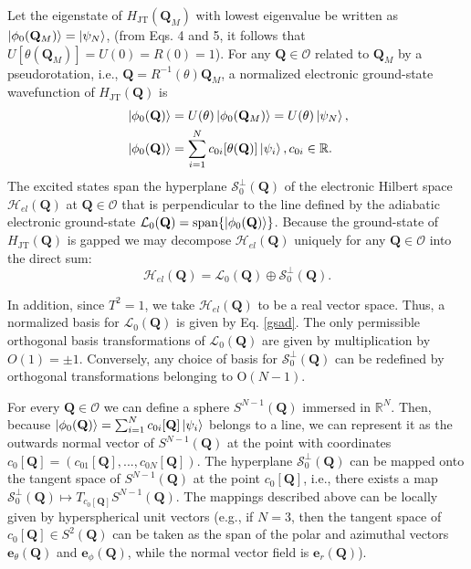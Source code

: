 \documentclass[superscriptaddress,showpacs,amsmath,amssymb,pra,twocolumn]{revtex4-1}
\begin{document}
Let the eigenstate of $H_{\text{JT}}(\mathbf{Q}_{M})$ with lowest
eigenvalue be written as $\ket{\phi_{0}(\mathbf{Q}_{M})}=\ket{\psi_{N}}$,
(from Eqs. 4 and 5, it follows that $U[\theta(\mathbf{Q}_{M})]=U(0)=R(0)=1$).
For any $\mathbf{Q}\in\mathcal{O}$ related to $\mathbf{Q}_{M}$ by
a pseudorotation, i.e., $\mathbf{Q}=R^{-1}(\theta)\mathbf{Q}_{M}$,
a normalized electronic ground-state wavefunction of $H_{\text{JT}}(\mathbf{Q})$
is 
\begin{align}
 & \ket{\phi_{0}(\mathbf{Q})}=U(\theta)\ket{\phi_{0}(\mathbf{Q}_{M})}=U(\theta)\ket{\psi_{N}},\nonumber \\
 & \ket{\phi_{0}(\mathbf{Q})}=\sum_{i=1}^{N}c_{0i}[\theta(\mathbf{Q})]\ket{\psi_{i}},c_{0i}\in\mathbb{R}.\label{gsad}
\end{align}
The excited states span the hyperplane $\mathcal{S}_{0}^{\perp}(\mathbf{Q})$
of the electronic Hilbert space $\mathcal{H}_{el}(\mathbf{Q})$ at
$\mathbf{Q}\in\mathcal{O}$ that is perpendicular to the line defined
by the adiabatic electronic ground-state $\mathcal{L}_{0}(\mathbf{Q})=\text{span}\{\ket{\phi_{0}(\mathbf{Q})}\}$.
Because the ground-state of $H_{\text{JT}}(\mathbf{Q})$ is gapped
we may decompose $\mathcal{H}_{el}(\mathbf{Q})$ uniquely for any
$\mathbf{Q}\in\mathcal{O}$ into the direct sum: 
\begin{equation}
\mathcal{H}_{el}(\mathbf{Q})=\mathcal{L}_{0}(\mathbf{Q})\oplus\mathcal{S}_{0}^{\perp}(\mathbf{Q}).
\end{equation}

In addition, since $T^{2}=1$, we take $\mathcal{H}_{el}(\mathbf{Q})$
to be a real vector space. Thus, a normalized basis for $\mathcal{L}_{0}(\mathbf{Q})$
is given by Eq. \ref{gsad}. The only permissible orthogonal basis
transformations of $\mathcal{L}_{0}(\mathbf{Q})$ are given by multiplication
by $O(1)=\pm1$. Conversely, any choice of basis for $\mathcal{S}_{0}^{\perp}(\mathbf{Q})$
can be redefined by orthogonal transformations belonging to O$(N-1)$.

For every $\mathbf{Q}\in\mathcal{O}$ we can define a sphere $S^{N-1}(\mathbf{Q})$
immersed in $\mathbb{R}^{N}$. Then, because $\ket{\phi_{0}(\mathbf{Q})}=\sum_{i=1}^{N}c_{0i}[\mathbf{Q}]\ket{\psi_{i}}$
belongs to a line, we can represent it as the outwards normal vector of $S^{N-1}(\mathbf{Q})$
at the point with coordinates $c_{0}[\mathbf{Q}]=(c_{01}[\mathbf{Q}],...,c_{0N}[\mathbf{Q}])$.
The hyperplane $\mathcal{S}_{0}^{\perp}(\mathbf{Q})$ can be mapped
onto the tangent space of $S^{N-1}(\mathbf{Q})$ at the point $c_0[\mathbf{Q}]$,
i.e., there exists a map $\mathcal{S}_{0}^{\perp}(\mathbf{Q})\mapsto T_{c_0[\mathbf{Q}]}S^{N-1}(\mathbf{Q})$.
The mappings described above can be locally given by hyperspherical
unit vectors (e.g., if $N=3$, then the tangent space of $c_0[\mathbf{Q}]\in S^{2}(\mathbf{Q})$
can be taken as the span of the polar and azimuthal vectors $\mathbf{e}_{\theta}(\mathbf{Q})$
and $\mathbf{e}_{\phi}(\mathbf{Q})$, while the normal vector field
is $\mathbf{e}_{r}(\mathbf{Q})$). 
\end{document}
